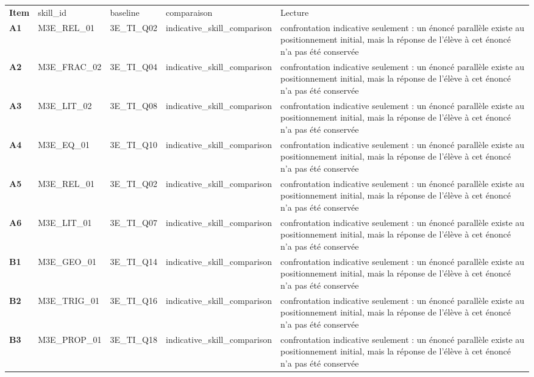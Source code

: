 \documentclass[10pt,a4paper]{article}
\begin{document}
\par\noindent\begin{tabularx}{\linewidth}{>{\bfseries}p{9mm} >{\ttfamily\scriptsize}p{25mm} >{\ttfamily\scriptsize}p{22mm} >{\ttfamily\scriptsize}p{16mm} X}
\rowcolor{Navy}\color{white}Item & \color{white}\scriptsize skill\_id & \color{white}\scriptsize baseline & \color{white}\scriptsize comparaison & \color{white}Lecture \\
A1 & M3E\_REL\_01 & 3E\_TI\_Q02 & indicative\_skill\_comparison & confrontation indicative seulement : un énoncé parallèle existe au positionnement initial, mais la réponse de l'élève à cet énoncé n'a pas été conservée \\
A2 & M3E\_FRAC\_02 & 3E\_TI\_Q04 & indicative\_skill\_comparison & confrontation indicative seulement : un énoncé parallèle existe au positionnement initial, mais la réponse de l'élève à cet énoncé n'a pas été conservée \\
A3 & M3E\_LIT\_02 & 3E\_TI\_Q08 & indicative\_skill\_comparison & confrontation indicative seulement : un énoncé parallèle existe au positionnement initial, mais la réponse de l'élève à cet énoncé n'a pas été conservée \\
A4 & M3E\_EQ\_01 & 3E\_TI\_Q10 & indicative\_skill\_comparison & confrontation indicative seulement : un énoncé parallèle existe au positionnement initial, mais la réponse de l'élève à cet énoncé n'a pas été conservée \\
A5 & M3E\_REL\_01 & 3E\_TI\_Q02 & indicative\_skill\_comparison & confrontation indicative seulement : un énoncé parallèle existe au positionnement initial, mais la réponse de l'élève à cet énoncé n'a pas été conservée \\
A6 & M3E\_LIT\_01 & 3E\_TI\_Q07 & indicative\_skill\_comparison & confrontation indicative seulement : un énoncé parallèle existe au positionnement initial, mais la réponse de l'élève à cet énoncé n'a pas été conservée \\
B1 & M3E\_GEO\_01 & 3E\_TI\_Q14 & indicative\_skill\_comparison & confrontation indicative seulement : un énoncé parallèle existe au positionnement initial, mais la réponse de l'élève à cet énoncé n'a pas été conservée \\
B2 & M3E\_TRIG\_01 & 3E\_TI\_Q16 & indicative\_skill\_comparison & confrontation indicative seulement : un énoncé parallèle existe au positionnement initial, mais la réponse de l'élève à cet énoncé n'a pas été conservée \\
B3 & M3E\_PROP\_01 & 3E\_TI\_Q18 & indicative\_skill\_comparison & confrontation indicative seulement : un énoncé parallèle existe au positionnement initial, mais la réponse de l'élève à cet énoncé n'a pas été conservée \\

\end{tabularx}
\end{document}
